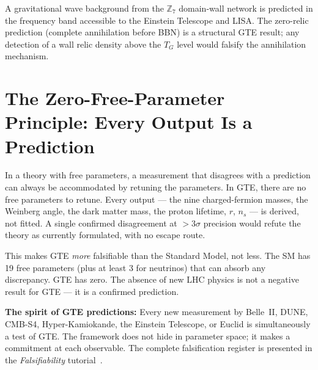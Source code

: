 \documentclass[11pt,a4paper]{article}
\newcommand{\CatAD}{\textbf{CatAD}}
\begin{document}
\begin{tcolorbox}[colback=boxorange,colframe=orange!60!black,
  title=GW Background from $\mathbb{Z}_7$ Phase Transition (\CatAD)]
A gravitational wave background from the $\mathbb{Z}_7$ domain-wall network is
predicted in the frequency band accessible to the Einstein Telescope and LISA.
The zero-relic prediction (complete annihilation before BBN) is a structural
GTE result; any detection of a wall relic density above the $T_G$ level would
falsify the annihilation mechanism.
\end{tcolorbox}

\section{The Zero-Free-Parameter Principle: Every Output Is a Prediction}
\label{sec:zfp}

\begin{tcolorbox}[colback=boxpurple,colframe=blue!40!black,
  title=The key insight about falsifiability]
In a theory with free parameters, a measurement that disagrees with a prediction
can always be accommodated by retuning the parameters.  In GTE, there are no
free parameters to retune.  Every output — the nine charged-fermion masses, the
Weinberg angle, the dark matter mass, the proton lifetime, $r$, $n_s$ — is
derived, not fitted.  A single confirmed disagreement at $>3\sigma$ precision
would refute the theory as currently formulated, with no escape route.
\end{tcolorbox}

This makes GTE \emph{more} falsifiable than the Standard Model, not less.  The
SM has 19 free parameters (plus at least 3 for neutrinos) that can absorb any
discrepancy.  GTE has zero.  The absence of new LHC physics is not a negative
result for GTE — it is a confirmed prediction.

\textbf{The spirit of GTE predictions:} Every new measurement by Belle~II, DUNE,
CMB-S4, Hyper-Kamiokande, the Einstein Telescope, or Euclid is simultaneously a
test of GTE.  The framework does not hide in parameter space; it makes a
commitment at each observable.  The complete falsification register is presented
in the \emph{Falsifiability} tutorial~\cite{SpivackTutorialFalsifiability}.

\end{document}
